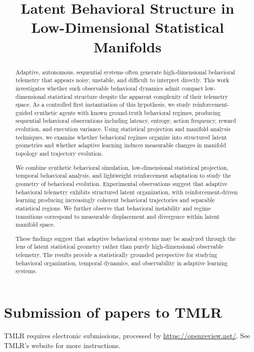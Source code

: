 \documentclass[10pt]{article} %
\title{Latent Behavioral Structure in Low-Dimensional Statistical Manifolds}
\begin{document}
\maketitle

\begin{abstract}
Adaptive, autonomous, sequential systems often generate high-dimensional behavioral telemetry that appears noisy, unstable, and difficult to interpret directly. This work investigates whether such observable behavioral dynamics admit compact low-dimensional statistical structure despite the apparent complexity of their telemetry space. As a controlled first instantiation of this hypothesis, we study reinforcement-guided synthetic agents with known ground-truth behavioral regimes, producing sequential behavioral observations including latency, entropy, action frequency, reward evolution, and execution variance. Using statistical projection and manifold analysis techniques, we examine whether behavioral regimes organize into structured latent geometries and whether adaptive learning induces measurable changes in manifold topology and trajectory evolution.

We combine synthetic behavioral simulation, low-dimensional statistical projection, temporal behavioral analysis, and lightweight reinforcement adaptation to study the geometry of behavioral evolution. Experimental observations suggest that adaptive behavioral telemetry exhibits structured latent organization, with reinforcement-driven learning producing increasingly coherent behavioral trajectories and separable statistical regions. We further observe that behavioral instability and regime transitions correspond to measurable displacement and divergence within latent manifold space.

These findings suggest that adaptive behavioral systems may be analyzed through the lens of latent statistical geometry rather than purely high-dimensional observable telemetry. The results provide a statistically grounded perspective for studying behavioral organization, temporal dynamics, and observability in adaptive learning systems.
\end{abstract}

\section{Submission of papers to TMLR}

TMLR requires electronic submissions, processed by
\url{https://openreview.net/}. See TMLR's website for more instructions.
\end{document}
